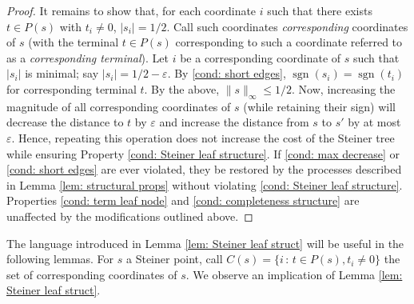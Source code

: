 \documentclass{theoretics}
\DeclareMathOperator{\sgn}{sgn}
\newcommand{\1}{\textbf{1}}
\begin{document}
\begin{proof}
It remains to show that, for each coordinate $i$ such that there exists $t \in P(s)$ with $t_i \neq 0$, $|s_i| = 1/2$. Call such coordinates \textit{corresponding} coordinates of $s$ (with the terminal $t \in P(s)$ corresponding to such a coordinate referred to as a \textit{corresponding terminal}). Let $i$ be a corresponding coordinate of $s$ such that $|s_i|$ is minimal; say $|s_i| = 1/2 - \varepsilon$. By \ref{cond: short edges}, $\sgn(s_i) = \sgn(t_i)$ for corresponding terminal $t.$ By the above, $\|s\|_{\infty} \leq 1/2$. Now, increasing the magnitude of all corresponding coordinates of $s$ (while retaining their sign) will decrease the distance to $t$ by $\varepsilon$ and increase the distance from $s$ to $s'$ by at most $\varepsilon$. Hence, repeating this operation does not increase the cost of the Steiner tree while ensuring Property \ref{cond: Steiner leaf structure}.  If \ref{cond: max decrease} or \ref{cond: short edges} are ever violated, they be restored by the processes described in Lemma \ref{lem: structural props} without violating \ref{cond: Steiner leaf structure}. Properties \ref{cond: term leaf node} and \ref{cond: completeness structure} are unaffected by the modifications outlined above.
\end{proof}

The language introduced in Lemma \ref{lem: Steiner leaf struct} will be useful in the following lemmas. For $s$ a Steiner point, call $C(s) = \{i \,:\, t \in P(s), t_i \neq 0\}$ the set of corresponding coordinates of $s$. We observe an implication of Lemma \ref{lem: Steiner leaf struct}.
\end{document}
